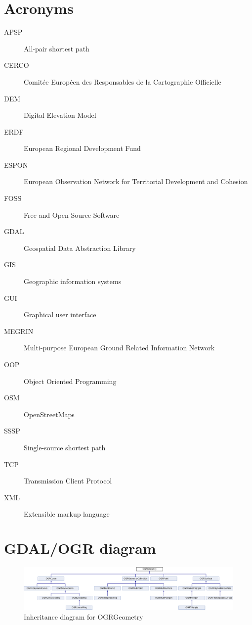 \documentclass[thesis=M,english]{FITthesis}[2012/10/20]
\begin{document}



\appendix

\chapter{Acronyms}
\begin{description}
	\item[APSP] All-pair shortest path
	\item[CERCO] Comit{\' e}e Europ{\' e}en des Responsables de la Cartographie Officielle
	\item[DEM] Digital Elevation Model
	\item[ERDF] European Regional Development Fund
	\item[ESPON] European Observation Network for Territorial Development and Cohesion
	\item[FOSS] Free and Open-Source Software
	\item[GDAL] Geospatial Data Abstraction Library
	\item[GIS] Geographic information systems	
	\item[GUI] Graphical user interface
	\item[MEGRIN] Multi-purpose European Ground Related Information Network
	\item[OOP] Object Oriented Programming
	\item[OSM] OpenStreetMaps
	\item[SSSP] Single-source shortest path
	\item[TCP] Transmission Client Protocol
	\item[XML] Extensible markup language
	
	
\end{description}

\chapter{GDAL/OGR diagram}


\begin{figure}[H]
\centering
\includegraphics[width=1\textwidth]{pics/classOGRGeometry}
\caption{Inheritance diagram for OGRGeometry}
\label{pic:OGRGeo}
\end{figure}
\end{document}
